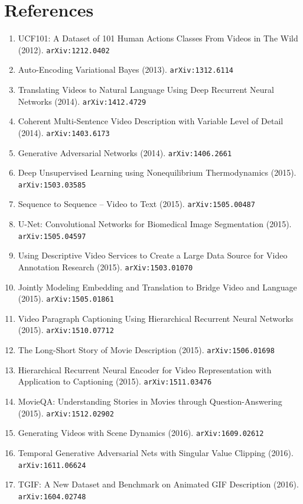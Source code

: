 \documentclass[11pt]{article}
\begin{document}
\section*{References}
\begin{enumerate}\small
  \item UCF101: A Dataset of 101 Human Actions Classes From Videos in The Wild (2012). \texttt{arXiv:1212.0402}
  \item Auto-Encoding Variational Bayes (2013). \texttt{arXiv:1312.6114}
  \item Translating Videos to Natural Language Using Deep Recurrent Neural
  Networks (2014). \texttt{arXiv:1412.4729}
  \item Coherent Multi-Sentence Video Description with Variable Level of Detail (2014). \texttt{arXiv:1403.6173}
  \item Generative Adversarial Networks (2014). \texttt{arXiv:1406.2661}
  \item Deep Unsupervised Learning using Nonequilibrium Thermodynamics (2015). \texttt{arXiv:1503.03585}
  \item Sequence to Sequence -- Video to Text (2015). \texttt{arXiv:1505.00487}
  \item U-Net: Convolutional Networks for Biomedical Image Segmentation (2015). \texttt{arXiv:1505.04597}
  \item Using Descriptive Video Services to Create a Large Data Source for Video
  Annotation Research (2015). \texttt{arXiv:1503.01070}
  \item Jointly Modeling Embedding and Translation to Bridge Video and Language (2015). \texttt{arXiv:1505.01861}
  \item Video Paragraph Captioning Using Hierarchical Recurrent Neural Networks (2015). \texttt{arXiv:1510.07712}
  \item The Long-Short Story of Movie Description (2015). \texttt{arXiv:1506.01698}
  \item Hierarchical Recurrent Neural Encoder for Video Representation with
  Application to Captioning (2015). \texttt{arXiv:1511.03476}
  \item MovieQA: Understanding Stories in Movies through Question-Answering (2015). \texttt{arXiv:1512.02902}
  \item Generating Videos with Scene Dynamics (2016). \texttt{arXiv:1609.02612}
  \item Temporal Generative Adversarial Nets with Singular Value Clipping (2016). \texttt{arXiv:1611.06624}
  \item TGIF: A New Dataset and Benchmark on Animated GIF Description (2016). \texttt{arXiv:1604.02748}

\end{enumerate}
\end{document}
